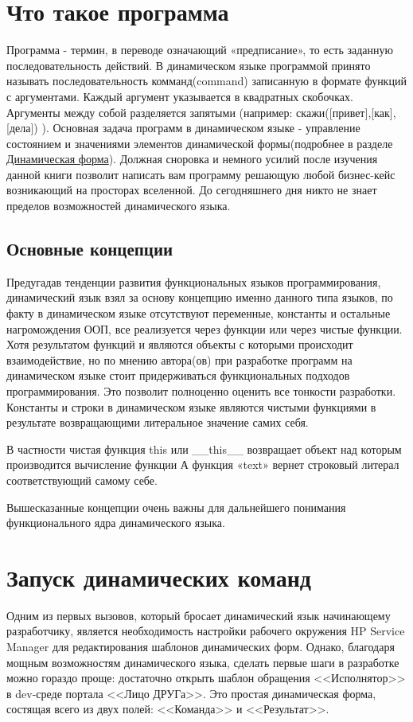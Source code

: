 \documentclass[../index.tex]{subfiles}
\begin{document}
\section{Что такое программа}
    Программа - термин, в переводе означающий «предписание», то есть заданную последовательность действий. В динамическом языке программой принято называть последовательность комманд(\gls{command}) записанную в формате функций с аргументами.
    Каждый аргумент указывается в квадратных скобочках. Аргументы между собой разделяется запятыми (например: скажи([привет],[как],[дела]) ). Основная задача программ в динамическом языке - управление состоянием и значениями элементов динамической формы(подробнее в разделе \hyperref[sec:dynfom]{Динамическая форма}).
    Должная сноровка и немного усилий после изучения данной книги позволит написать вам программу решающую любой бизнес-кейс возникающий на просторах вселенной. До сегодняшнего дня никто не знает пределов возможностей динамического языка.

    \subsection{Основные концепции}
        Предугадав тенденции развития функциональных языков программирования, динамический язык взял за основу концепцию именно данного типа языков, по факту в динамическом языке отсутствуют переменные, константы и остальные нагромождения ООП, все реализуется через функции или через чистые функции. Хотя результатом функций и являются объекты с которыми происходит взаимодействие, но по мнению автора(ов) при разработке программ на динамическом языке стоит придерживаться функциональных подходов программирования. Это позволит полноценно оценить все тонкости разработки.
        Константы и строки в динамическом языке являются чистыми функциями в результате возвращающими литеральное значение самих себя.
        
        В частности чистая функция this или __this__  возвращает объект над которым производится вычисление функции
        А функция «text» вернет строковый литерал соответствующий самому себе.
        
        Вышесказанные концепции очень важны для дальнейшего понимания функционального ядра динамического языка.

	\section{Запуск динамических команд}
	Одним из первых вызовов, который бросает динамический язык начинающему разработчику, является необходимость настройки рабочего окружения HP Service Manager для редактирования шаблонов динамических форм. Однако, благодаря мощным возможностям динамического языка, сделать первые шаги в разработке можно гораздо проще: достаточно открыть шаблон обращения <<Исполнятор>> в dev-среде портала <<Лицо ДРУГа>>. Это простая динамическая форма, состящая всего из двух полей: <<Команда>> и <<Результат>>.
	
\end{document}
